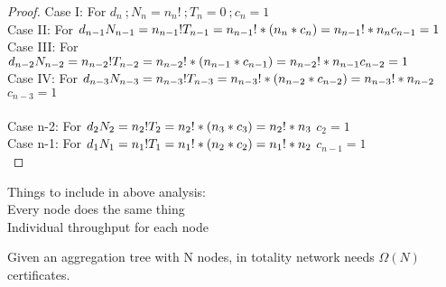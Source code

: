 \begin{proof}

	Case I: For $d_{n}\ ; N_{n} = n_{n}!\ ; T_{n} = 0\ ; c_{n} = 1 $\\
	Case II: For $d_{n - 1}\\ N_{n - 1} = n_{n - 1}!\\ T_{n - 1} = n_{n - 1}! * (n_{n} * c_{n}) = n_{n - 1}! * n_{n}\\ c_{n - 1} = 1\\ $
	Case III: For $d_{n - 2}\\ N_{n - 2} = n_{n - 2}!\\ T_{n -2} = n_{n - 2}! * (n_{n - 1} * c_{n - 1}) = n_{n - 2}! * n_{n - 1 } \\ c_{n - 2} = 1$\\
	Case IV: For $d_{n - 3}\\ N_{n - 3} = n_{n - 3}!\\ T_{n -3} = n_{n - 3}! * (n_{n - 2} * c_{n - 2}) = n_{n - 3}! * n_{n - 2 } \\$     $c_{n - 3} = 1$\\ \\
	Case n-2: For $d_{2}\\ N_{2} = n_{2}!\\ T_{2} = n_{2}! * (n_{3} * c_{3}) = n_{2}! * n_{3} \\$  $c_{2} = 1$\\
	Case n-1: For $d_{1}\\ N_{1} = n_{1}!\\ T_{1} = n_{1}! * (n_{2} * c_{2}) = n_{1}! * n_{2} \\$  $c_{n-1} = 1$\\

\end{proof}


Things to include in above analysis:\\
	Every node does the same thing\\
	Individual throughput for each node\\

\begin{theorem} \label{min certificates}
	Given an aggregation tree with N nodes, in totality network needs $\Omega(N)$ certificates.
\end{theorem}

